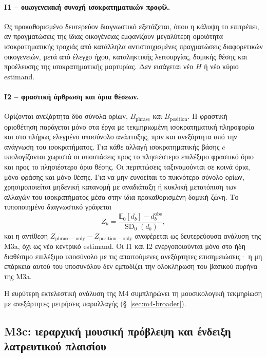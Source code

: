 \documentclass[11pt,a4paper]{article}
\begin{document}
\paragraph{I1 -- οικογενειακή συνοχή ισοκρατηματικών προφίλ.} Ως προκαθορισμένο δευτερεύον διαγνωστικό εξετάζεται, όπου η κάλυψη το επιτρέπει, αν πραγματώσεις της ίδιας οικογένειας εμφανίζουν μεγαλύτερη ομοιότητα ισοκρατηματικής τροχιάς από κατάλληλα αντιστοιχισμένες πραγματώσεις διαφορετικών οικογενειών, μετά από έλεγχο ήχου, καταληκτικής λειτουργίας, δομικής θέσης και προέλευσης της ισοκρατηματικής μαρτυρίας. Δεν εισάγεται νέο $H$ ή νέο κύριο estimand.

\paragraph{I2 -- φραστική άρθρωση και όρια θέσεων.} Ορίζονται ανεξάρτητα δύο σύνολα ορίων, $B_{\mathrm{phrase}}$ και $B_{\mathrm{position}}$. Η φραστική οριοθέτηση παράγεται μόνο στα έργα με τεκμηριωμένη ισοκρατηματική πληροφορία και στο πλήρως ελεγμένο υποσύνολο ανάπτυξης, πριν και ανεξάρτητα από την ανάγνωση του ισοκρατήματος. Για κάθε αλλαγή ισοκρατηματικής βάσης $c$ υπολογίζονται χωριστά οι αποστάσεις προς το πλησιέστερο επιλέξιμο φραστικό όριο και προς το πλησιέστερο όριο θέσης. Οι περιπτώσεις ταξινομούνται σε κοινά όρια, μόνο φράσης και μόνο θέσης. Για να μην ευνοείται το πυκνότερο σύνολο ορίων, χρησιμοποιείται μηδενική κατανομή με αναδιάταξη ή κυκλική μετατόπιση των αλλαγών του ισοκρατήματος μέσα στην ίδια προκαθορισμένη δομική ζώνη. Το τυποποιημένο διαγνωστικό γράφεται
\[
Z_b=\frac{\mathbb E_0[d_b]-d_b^{\mathrm{obs}}}{\operatorname{SD}_0(d_b)},
\]
και η αντίθεση $Z_{\mathrm{phrase-only}}-Z_{\mathrm{position-only}}$ αναφέρεται ως δευτερεύουσα ανάλυση της M3a, όχι ως νέο κεντρικό estimand. Οι I1 και I2 ενεργοποιούνται μόνο στο ήδη διαθέσιμο επιλέξιμο υποσύνολο με τις απαιτούμενες ανεξάρτητες επισημειώσεις· η μη επάρκεια αυτού του υποσυνόλου δεν εμποδίζει την ολοκλήρωση του βασικού πυρήνα της M3a.

Η ευρύτερη εκτελεστική ανάλυση της M4 συμπληρώνει τη μουσικολογική τεκμηρίωση με ανεξάρτητες μετρήσεις παραλλαγής (§~\ref{sec:m4-broader}).

\subsection{M3c: ιεραρχική μουσική πρόβλεψη και ένδειξη λατρευτικού πλαισίου}\label{sec:m3c}
\end{document}
